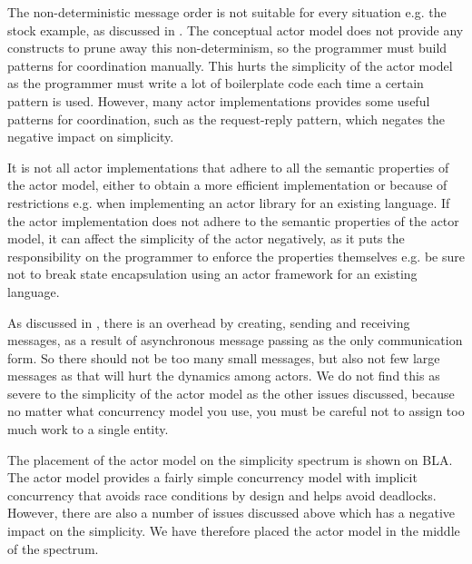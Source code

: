 The non-deterministic message order is not suitable for every situation e.g. the stock example, as discussed in . The conceptual actor model does not provide any constructs to prune away this non-determinism, so the programmer  must build patterns for coordination manually. This hurts the simplicity of the actor model as the programmer must write a lot of boilerplate code each time a certain pattern is used. However, many actor implementations provides some useful patterns for coordination, such as the request-reply pattern, which negates the negative impact on simplicity.

It is not all actor implementations that adhere to all the semantic properties of the actor model, either to obtain a more efficient implementation or because of restrictions e.g. when implementing an actor library for an existing language. If the actor implementation does not adhere to the semantic properties of the actor model, it can affect the simplicity of the actor negatively, as it puts the responsibility on the programmer to enforce the properties themselves e.g. be sure not to break state encapsulation using an actor framework for an existing language.

As discussed in , there is an overhead by creating, sending and receiving messages, as a result of asynchronous message passing as the only communication form. So there should not be too many small messages, but also not few large messages as that will hurt the dynamics among actors. We do not find this as severe to the simplicity of the actor model as the other issues discussed, because no matter what concurrency model you use, you must be careful not to assign too much work to a single entity. 

The placement of the actor model on the simplicity spectrum is shown on BLA. The actor model provides a fairly simple concurrency model with implicit concurrency that avoids race conditions by design and helps avoid deadlocks. However, there are also a number of issues discussed above which has a negative impact on the simplicity. We have therefore placed the actor model in the middle of the spectrum.

